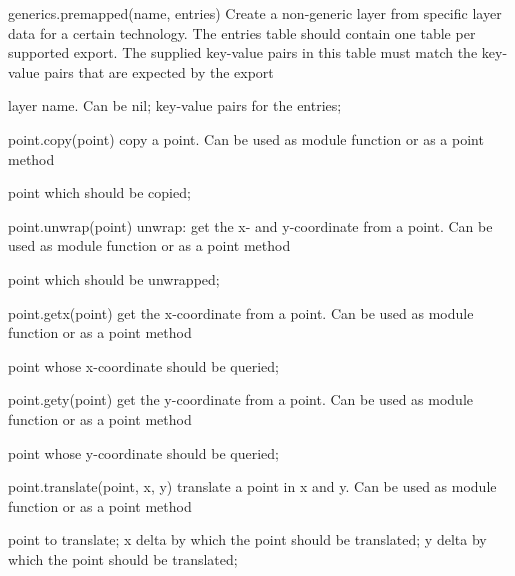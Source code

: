\begin{APIfunc}{generics.premapped(name, entries)}
    Create a non-generic layer from specific layer data for a certain technology. The entries table should contain one table per supported export. The supplied key-value pairs in this table must match the key-value pairs that are expected by the export
    \begin{APIparameters}
            layer name. Can be nil;
            key-value pairs for the entries;
    \end{APIparameters}
\end{APIfunc}
\begin{APIfunc}{point.copy(point)}
    copy a point. Can be used as module function or as a point method
    \begin{APIparameters}
            point which should be copied;
    \end{APIparameters}
\end{APIfunc}
\begin{APIfunc}{point.unwrap(point)}
    unwrap: get the x- and y-coordinate from a point. Can be used as module function or as a point method
    \begin{APIparameters}
            point which should be unwrapped;
    \end{APIparameters}
\end{APIfunc}
\begin{APIfunc}{point.getx(point)}
    get the x-coordinate from a point. Can be used as module function or as a point method
    \begin{APIparameters}
            point whose x-coordinate should be queried;
    \end{APIparameters}
\end{APIfunc}
\begin{APIfunc}{point.gety(point)}
    get the y-coordinate from a point. Can be used as module function or as a point method
    \begin{APIparameters}
            point whose y-coordinate should be queried;
    \end{APIparameters}
\end{APIfunc}
\begin{APIfunc}{point.translate(point, x, y)}
    translate a point in x and y. Can be used as module function or as a point method
    \begin{APIparameters}
            point to translate;
            x delta by which the point should be translated;
            y delta by which the point should be translated;
    \end{APIparameters}
\end{APIfunc}
